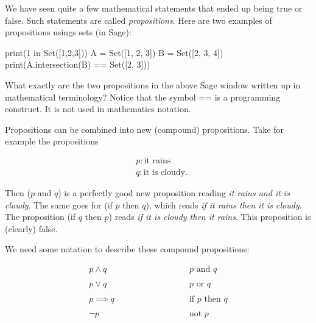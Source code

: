 \documentclass{article}
\begin{document}
We have seen quite a few mathematical statements that ended up 
being true or false. Such statements are called \emph{propositions}.
Here are two examples of propositions usings sets (in Sage):

\begin{sage}
print(1 in Set([1,2,3]))
A = Set([1, 2, 3])
B = Set([2, 3, 4])
print(A.intersection(B) == Set([2, 3])) 
\end{sage}

\beginshex
What exactly are the two propositions in the above Sage window written
up in mathematical terminology? Notice that the symbol == is
a programming construct. It is not used in mathematics notation.
\endshex

Propositions can be combined into
new (compound) propositions. Take for example the propositions

\begin{align*}
&p: \text{it rains}\\
&q: \text{it is cloudy}.
\end{align*}
  
  Then ($p$ and $q$) is a perfectly good
  new proposition reading \emph{it rains and it is cloudy}. The same goes for (if $p$ then $q$), which reads
  \emph{if it rains then it is cloudy}. The proposition (if $q$ then $p$) reads \emph{if it is cloudy then
    it rains}. This proposition is (clearly) false.



We need some notation to describe these compound propositions:

\begin{equation*}
\begin{array}{ll}
p \land q\qquad\qquad & \qquad\qquad p \text{ and } q\\
\\
p \lor q\qquad\qquad & \qquad\qquad p \text{ or } q\\
\\
p\implies q\qquad\qquad & \qquad\qquad \text{if } p \text{ then } q\\
\\
\neg p\qquad\qquad & \qquad\qquad \text{not } p
\end{array}
\end{equation*}
\end{document}
